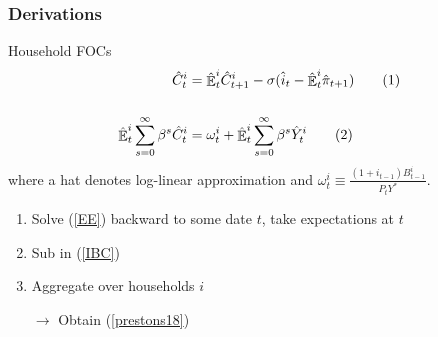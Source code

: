 \documentclass{beamer}
\DeclareMathOperator{\E}{\mathbb{E}}
\newcommand\numberthis{\addtocounter{equation}{1}\tag{\theequation}} %
\begin{document}
\begin{frame}
	\frametitle{Derivations}
	\label{derivations}

Household FOCs
 \begin{align*}
\hat{C}_{t}^i & = \hat{\E}^i_t \hat{C}_{t+1}^i - \sigma(\hat{i}_{t} -\hat{\E}^i_t \hat{\pi}_{t+1})    \label{EE} \numberthis \\
\\
\hat{\E}^i_t \sum_{s=0}^{\infty}\beta^s \hat{C}^i_t& =\omega^i_t + \hat{\E}^i_t \sum_{s=0}^{\infty}\beta^s \hat{Y}^i_t \label{IBC} \numberthis
\end{align*}
where a hat denotes log-linear approximation and $\omega_t^i \equiv \frac{(1+i_{t-1})B^i_{t-1} }{P_t Y^*}$.

\begin{enumerate}
\item Solve (\ref{EE}) backward to some date $t$, take expectations at $t$ 
\item Sub in (\ref{IBC})
\item Aggregate over households $i$
\item[$\rightarrow$] Obtain (\ref{prestons18})
\end{enumerate}



\hyperlink{NK}{}	


\end{frame}
\end{document}
